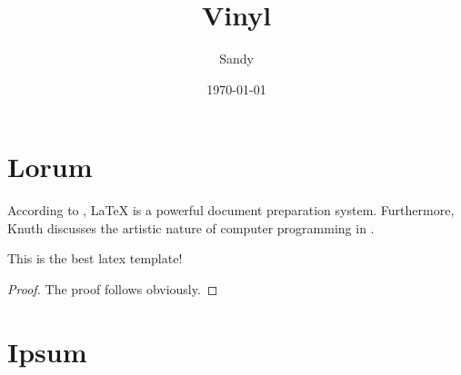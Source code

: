 \documentclass[note]{vinyl}
\title{Vinyl}
\author{Sandy}
\date{\today}
\begin{document}
\maketitle

\section{Lorum}

According to \cite{lamport1994latex}, LaTeX is a powerful document preparation system.
Furthermore, Knuth discusses the artistic nature of computer programming in \cite{knuth1974computer}.

\lipsum[2-3]

\begin{theorem}
	This is the best latex template!
\end{theorem}
\begin{proof}
	The proof follows obviously.
\end{proof}

\section{Ipsum}

\lipsum[4-16]

\printbibliography
\end{document}
